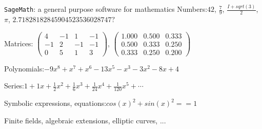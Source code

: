 \documentclass[%
]{beamer}
\newcommand{\fr}[1]{}
\newcommand{\en}[1]{#1}
\newcommand{\SageMath}{\texttt{SageMath}\xspace}
\newcommand{\blue}[1]{{\color{blue}#1}}
\begin{document}
\begin{frame}[fragile]{\SageMath: \fr{un logiciel de calcul
      mathématique}\en{a general purpose software for mathematics}}
  \pause
  \blue{\fr{Nombres}\en{Numbers}:}\quad $42$, $\frac79$, $\frac{I+sqrt(3)}2$, $\pi$, $2.71828182845904523536028747?$
  \bigskip\pause

  \blue{Matrices:}
  $\left(\begin{array}{rrrr}
      4 & -1 & 1 & -1 \\
      -1 & 2 & -1 & -1 \\
      0 & 5 & 1 & 3
    \end{array}\right)$,
  $\left(\begin{array}{rrr}
      1.000 & 0.500 & 0.333 \\
      0.500 & 0.333 & 0.250 \\
      0.333 & 0.250 & 0.200
    \end{array}\right)$

  \bigskip\pause

  \blue{\fr{Polynômes}\en{Polynomials}:}\quad $-9x^{8} + x^{7} + x^{6} - 13x^{5} - x^{3} - 3x^{2} - 8x + 4$ %
  \bigskip\pause

  \blue{\fr{Séries}\en{Series}:}\quad $1 + 1 x + \frac{1}{2} x^{2} + \frac{1}{6} x^{3} + \frac{1}{24} x^{4} + \frac{1}{120} x^{5} + \cdots$
  \bigskip\pause

  \blue{\fr{Expressions symboliques, équations}\en{Symbolic expressions, equations}:}\quad $cos(x)^2 + sin(x)^2 == 1$

  \bigskip\pause

  \blue{\fr{Corps finis, extensions algébriques, courbes elliptiques, ...}
  \en{Finite fields, algebraic extensions, elliptic curves, ...}}

\end{frame}
\end{document}
